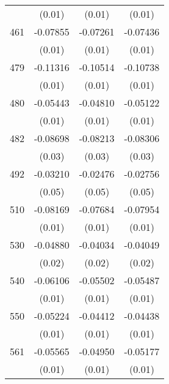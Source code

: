 \begin{table}[htbp]
\begin{tabular}{l*{3}{c}}
                    &      (0.01)         &      (0.01)         &      (0.01)         \\
461                 &    -0.07855\sym{***}&    -0.07261\sym{***}&    -0.07436\sym{***}\\
                    &      (0.01)         &      (0.01)         &      (0.01)         \\
479                 &    -0.11316\sym{***}&    -0.10514\sym{***}&    -0.10738\sym{***}\\
                    &      (0.01)         &      (0.01)         &      (0.01)         \\
480                 &    -0.05443\sym{***}&    -0.04810\sym{***}&    -0.05122\sym{***}\\
                    &      (0.01)         &      (0.01)         &      (0.01)         \\
482                 &    -0.08698\sym{**} &    -0.08213\sym{**} &    -0.08306\sym{**} \\
                    &      (0.03)         &      (0.03)         &      (0.03)         \\
492                 &    -0.03210         &    -0.02476         &    -0.02756         \\
                    &      (0.05)         &      (0.05)         &      (0.05)         \\
510                 &    -0.08169\sym{***}&    -0.07684\sym{***}&    -0.07954\sym{***}\\
                    &      (0.01)         &      (0.01)         &      (0.01)         \\
530                 &    -0.04880\sym{**} &    -0.04034\sym{*}  &    -0.04049\sym{*}  \\
                    &      (0.02)         &      (0.02)         &      (0.02)         \\
540                 &    -0.06106\sym{***}&    -0.05502\sym{***}&    -0.05487\sym{***}\\
                    &      (0.01)         &      (0.01)         &      (0.01)         \\
550                 &    -0.05224\sym{***}&    -0.04412\sym{**} &    -0.04438\sym{**} \\
                    &      (0.01)         &      (0.01)         &      (0.01)         \\
561                 &    -0.05565\sym{***}&    -0.04950\sym{***}&    -0.05177\sym{***}\\
                    &      (0.01)         &      (0.01)         &      (0.01)         \\

\end{tabular}
\end{table}
